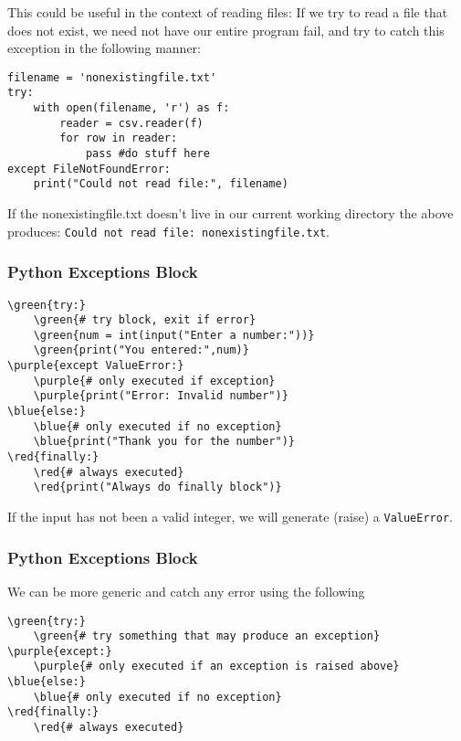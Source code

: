 \documentclass[xcolor=svgnames]{beamer}
\newcommand{\red}[1]{\textcolor{red}{#1}}
\newcommand{\green}[1]{\textcolor{ForestGreen}{#1}}
\newcommand{\blue}[1]{{\textcolor{blue}{#1}}}
\newcommand{\purple}[1]{{\textcolor{purple}{#1}}}
\newcommand{\ft}[1]{\frametitle{#1}}
\begin{document}
\begin{frame}[fragile]
This could be useful in the context of reading files: If we try to read a file that does not exist, we need not have our entire program fail, and try to catch this exception in the following manner:
\begin{Verbatim}[frame=single, xleftmargin=0.5in]
filename = 'nonexistingfile.txt'
try:
    with open(filename, 'r') as f:
        reader = csv.reader(f)
        for row in reader:
            pass #do stuff here
except FileNotFoundError:
    print("Could not read file:", filename)
\end{Verbatim}
If the {\sf nonexistingfile.txt} doesn't live in our current working directory the above produces: \verb|Could not read file: nonexistingfile.txt|.
\end{frame}







\begin{frame}[fragile]\ft{Python Exceptions Block}

\begin{Verbatim}[xleftmargin=.5in, commandchars=\\\{\}] 
\green{try:}
    \green{# try block, exit if error}
    \green{num = int(input("Enter a number:"))}
    \green{print("You entered:",num)}
\purple{except ValueError:}
    \purple{# only executed if exception}
    \purple{print("Error: Invalid number")}
\blue{else:}
    \blue{# only executed if no exception}
    \blue{print("Thank you for the number")}
\red{finally:}
    \red{# always executed}
    \red{print("Always do finally block")}
\end{Verbatim}
If the input has not been a valid integer, we will generate (raise) a {\tt ValueError}.
\end{frame}




\begin{frame}[fragile]\ft{Python Exceptions Block}
We can be more generic and catch any error using the following
\begin{Verbatim}[xleftmargin=0.1in, commandchars=\\\{\}] 
\green{try:}
    \green{# try something that may produce an exception}
\purple{except:}
    \purple{# only executed if an exception is raised above}
\blue{else:}
    \blue{# only executed if no exception}
\red{finally:}
    \red{# always executed}
\end{Verbatim}
\end{frame}
\end{document}
